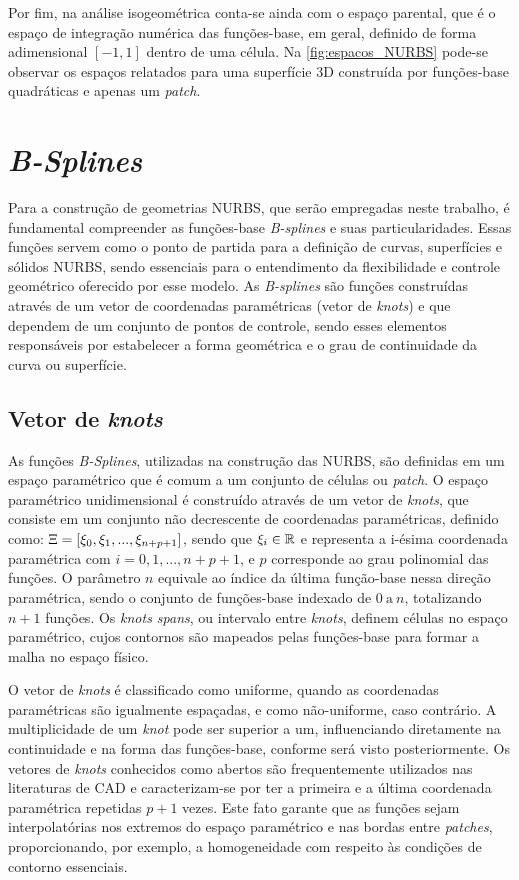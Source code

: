 Por fim, na análise isogeométrica conta-se ainda com o espaço parental, que é o espaço de integração numérica das funções-base, em geral, definido de forma adimensional $[-1, 1]$ dentro de uma célula. Na \autoref{fig:espacos_NURBS} pode-se observar os espaços relatados para uma superfície 3D construída por funções-base quadráticas e apenas um \textit{patch}. 

\section{\textit{B-Splines}} \label{capitulo:Cap3:Bsplines}

Para a construção de geometrias NURBS, que serão empregadas neste trabalho, é fundamental compreender as funções-base \textit{B-splines} e suas particularidades. Essas funções servem como o ponto de partida para a definição de curvas, superfícies e sólidos NURBS, sendo essenciais para o entendimento da flexibilidade e controle geométrico oferecido por esse modelo. As \textit{B-splines} são funções construídas através de um vetor de coordenadas paramétricas (vetor de \textit{knots}) e que dependem de um conjunto de pontos de controle, sendo esses elementos responsáveis por estabelecer a forma geométrica e o grau de continuidade da curva ou superfície.

\subsection{Vetor de \textit{knots}}

As funções \textit{B-Splines}, utilizadas na construção das NURBS, são definidas em um espaço paramétrico que é comum a um conjunto de células ou \textit{patch}. O espaço paramétrico unidimensional é construído através de um vetor de \textit{knots}, que consiste em um conjunto não decrescente de coordenadas paramétricas, definido como: $\Xi=\left[\xi_{0},\xi_{1},...,\xi_{n+p+1}\right]$,  sendo que $\xi_{i}\in \mathbb{R}$ e representa a i-ésima coordenada paramétrica  com $i = 0, 1, ..., n+p+1$, e $p$ corresponde ao grau polinomial das funções. O parâmetro  $n$ equivale ao índice da última função-base nessa direção paramétrica, sendo o conjunto de funções-base indexado de 
$0 \ \text{a}  \ n$, totalizando $n+1$ funções. Os \textit{knots spans}, ou intervalo entre \textit{knots}, definem células no espaço paramétrico, cujos contornos são mapeados pelas funções-base para formar a malha no espaço físico. 

O vetor de \textit{knots} é classificado como uniforme, quando as coordenadas paramétricas são igualmente espaçadas, e como não-uniforme, caso contrário. A multiplicidade de um \textit{knot} pode ser superior a um, influenciando diretamente na continuidade e na forma das funções-base, conforme será visto posteriormente.  Os vetores de \textit{knots} conhecidos como abertos são frequentemente utilizados nas literaturas de CAD e caracterizam-se por ter a primeira e a última coordenada paramétrica repetidas $p+1$ vezes. Este fato garante que as funções sejam interpolatórias nos extremos do espaço paramétrico e nas bordas entre \textit{patches}, proporcionando, por exemplo, a homogeneidade com respeito às condições de contorno essenciais. 

